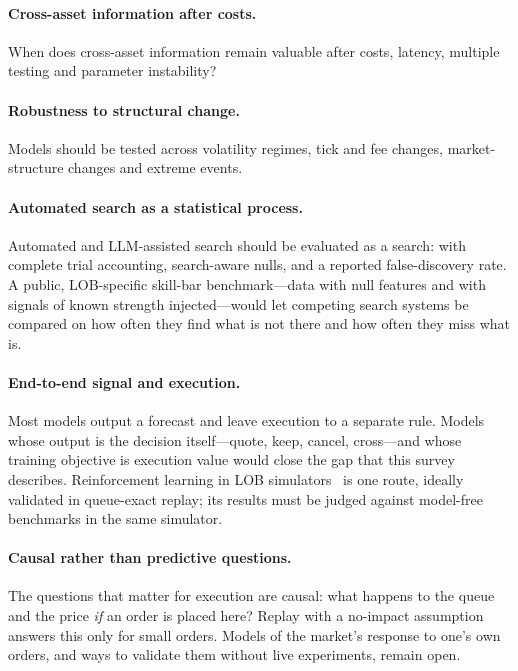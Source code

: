 \paragraph{Cross-asset information after costs.} When does cross-asset information remain valuable
after costs, latency, multiple testing and parameter instability?

\paragraph{Robustness to structural change.} Models should be tested across volatility regimes,
tick and fee changes, market-structure changes and extreme events.

\paragraph{Automated search as a statistical process.} Automated and LLM-assisted search should be
evaluated as a search: with complete trial accounting, search-aware nulls, and a reported
false-discovery rate. A public, LOB-specific skill-bar benchmark---data with null features and with
signals of known strength injected---would let competing search systems be compared on how often they
find what is not there and how often they miss what is.

\paragraph{End-to-end signal and execution.} Most models output a forecast and leave execution to a
separate rule. Models whose output is the decision itself---quote, keep, cancel, cross---and whose
training objective is execution value would close the gap that this survey describes. Reinforcement
learning in LOB simulators~\citep{lalor2025nhp,frey2023} is one route, ideally validated in queue-exact replay; its results must be
judged against model-free benchmarks in the same simulator.

\paragraph{Causal rather than predictive questions.} The questions that matter for execution are
causal: what happens to the queue and the price \emph{if} an order is placed here? Replay with a
no-impact assumption answers this only for small orders. Models of the market's response to one's own
orders, and ways to validate them without live experiments, remain open.

